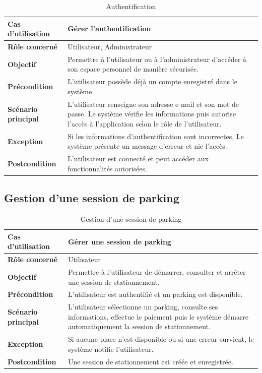 \begin{table}[H]
\centering
\renewcommand{\arraystretch}{1.25}
\begin{tabular}{|p{}|p{}|}
\hline
\textbf{Cas d'utilisation} &  Gérer l'authentification\\
\hline
\textbf{Rôle concerné} & Utilisateur, Administrateur \\
\hline
\textbf{Objectif} & Permettre à l'utilisateur ou à l'administrateur d'accéder à son espace personnel de manière sécurisée. \\
\hline
\textbf{Précondition} & L'utilisateur possède déjà un compte enregistré dans le système. \\
\hline
\textbf{Scénario principal} & L'utilisateur renseigne son adresse e-mail et son mot de passe. Le système vérifie les informations puis autorise l'accès à l'application selon le rôle de l'utilisateur. \\
\hline
\textbf{Exception} & Si les informations d'authentification sont incorrectes, Le système présente un message d'erreur et nie l'accès. \\
\hline
\textbf{Postcondition} & L'utilisateur est connecté et peut accéder aux fonctionnalités autorisées. \\
\hline
\end{tabular}
\caption{Authentification}
\label{tab:login}
\end{table}



\subsection{Gestion d'une session de parking}

\begin{table}[H]
\centering
\renewcommand{\arraystretch}{1.25}
\begin{tabular}{|p{}|p{}|}
\hline
\textbf{Cas d'utilisation} & Gérer une session de parking \\
\hline
\textbf{Rôle concerné} & Utilisateur \\
\hline
\textbf{Objectif} & Permettre à l'utilisateur de démarrer, consulter et arrêter une session de stationnement. \\
\hline
\textbf{Précondition} & L'utilisateur est authentifié et un parking est disponible. \\
\hline
\textbf{Scénario principal} & L'utilisateur sélectionne un parking, consulte ses informations, effectue le paiement puis le système démarre automatiquement la session de stationnement. \\
\hline
\textbf{Exception} & Si aucune place n'est disponible ou si une erreur survient, le système notifie l'utilisateur. \\
\hline
\textbf{Postcondition} & Une session de stationnement est créée et enregistrée. \\
\hline
\end{tabular}
\caption{Gestion d'une session de parking}
\label{tab:parking_session}
\end{table}




